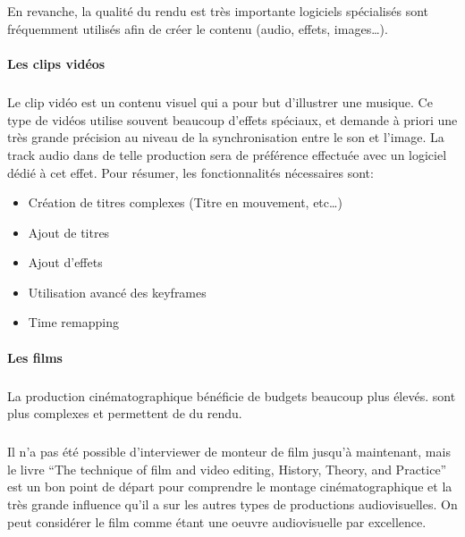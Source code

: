 \subparagraph{}

En revanche, la qualité du rendu est très importante%
logiciels spécialisés sont fréquemment utilisés afin de créer le
contenu (audio, effets, images\ldots).

\paragraph {Les clips vidéos}

\subparagraph{}

Le clip vidéo est un contenu visuel qui a pour but d'illustrer une
musique. Ce type de vidéos utilise souvent beaucoup d'effets spéciaux,
et demande à priori une très grande précision au niveau de la
synchronisation entre le son et l'image. La track audio dans de telle
production sera de préférence effectuée avec un logiciel dédié
à cet effet. Pour résumer, les fonctionnalités nécessaires sont:
\begin{itemize} \setlength{\itemsep}{2mm}
  \item{Création de titres complexes (Titre en mouvement, etc\ldots)}
  \item{Ajout de titres} \item{Ajout d'effets} \item{Utilisation avancé
  des keyframes} \item{Time remapping}
\end{itemize}

\paragraph {Les films}

\subparagraph{}

La production cinématographique bénéficie de budgets beaucoup plus
élevés. %
sont plus complexes et permettent de %
du rendu.

\subparagraph{}

Il n'a pas été possible d'interviewer de monteur de film jusqu'à
maintenant, mais le livre ``The technique of film and video editing,
History, Theory, and Practice'' \cite{TheTechniqueOfFilmAndVideoEditing}
est un bon point de départ pour comprendre le montage cinématographique
et la très grande influence qu'il a sur les autres types de productions
audiovisuelles. On peut considérer le film comme étant une oeuvre
audiovisuelle par excellence. %

